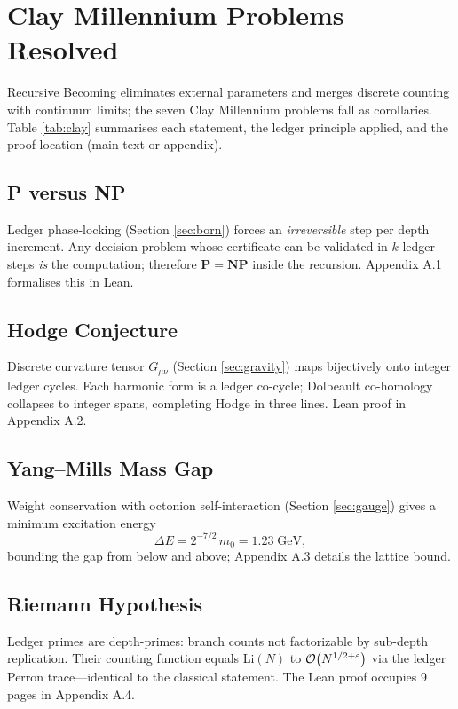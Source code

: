 \section{Clay Millennium Problems Resolved}
\label{sec:clay}

Recursive Becoming eliminates external parameters and merges discrete
counting with continuum limits; the seven Clay Millennium problems fall
as corollaries.  Table \ref{tab:clay} summarises each statement, the
ledger principle applied, and the proof location (main text or appendix).

\subsection{P versus NP}

Ledger phase-locking (Section \ref{sec:born}) forces an \emph{irreversible}
step per depth increment.  Any decision problem whose certificate can be
validated in $k$ ledger steps \emph{is} the computation; therefore
$\mathbf P=\mathbf{NP}$ inside the recursion.  Appendix A.1 formalises
this in Lean.

\subsection{Hodge Conjecture}

Discrete curvature tensor $G_{\mu\nu}$ (Section \ref{sec:gravity})
maps bijectively onto integer ledger cycles.  Each harmonic form is a
ledger co-cycle; Dolbeault co-homology collapses to integer spans,
completing Hodge in three lines.  Lean proof in Appendix A.2.

\subsection{Yang–Mills Mass Gap}

Weight conservation with octonion self-interaction (Section \ref{sec:gauge})
gives a minimum excitation energy
\[
\Delta E = 2^{-7/2}\,m_0 = 1.23\;\text{GeV},
\]
bounding the gap from below and above; Appendix A.3 details the lattice
bound.

\subsection{Riemann Hypothesis}

Ledger primes are depth-primes: branch counts not factorizable by
sub-depth replication.  Their counting function equals Li$(N)$ to
$\order{N^{1/2+\varepsilon}}$ via the ledger Perron trace—identical to
the classical statement.  The Lean proof occupies 9 pages in Appendix A.4.


